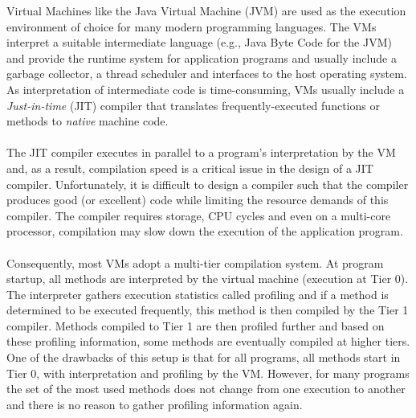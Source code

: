 Virtual Machines like the Java Virtual Machine (JVM) are used as the execution environment of choice for many modern programming languages. 
The VMs interpret a suitable intermediate language (e.g., Java Byte Code for the JVM) and provide the runtime system for application programs and usually include a garbage collector, a thread scheduler and interfaces to the host operating system. 
As interpretation of intermediate code is time-consuming, VMs usually include a \textit{Just-in-time} (JIT) compiler that translates frequently-executed functions or methods to \textit{native} machine code.
\\\\
The JIT compiler executes in parallel to a program's interpretation by the VM and, as a result, compilation speed is a critical issue in the design of a JIT compiler.
Unfortunately, it is difficult to design a compiler such that the compiler produces good (or excellent) code while limiting the resource demands of this compiler. The compiler requires storage, CPU cycles and even on a multi-core processor, compilation may slow down the execution of the application program.
\\\\
Consequently, most VMs adopt a multi-tier compilation system.
At program startup, all methods are interpreted by the virtual machine (execution at Tier 0). The interpreter gathers execution statistics called profiling and if a method is determined to be executed frequently, this method is then compiled by the Tier 1 compiler. Methods compiled to Tier 1 are then profiled further and based on these profiling information, some methods are eventually compiled at higher tiers.
One of the drawbacks of this setup is that for all programs, all methods start in Tier 0, with interpretation and profiling by the VM. However, for many programs the set of the most used methods does not change from one execution to another and there is no reason to gather profiling information again. 
